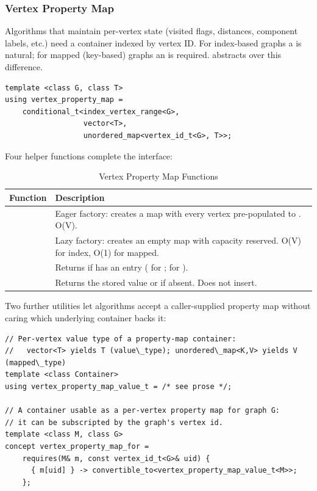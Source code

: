 \subsubsection{Vertex Property Map}

Algorithms that maintain per-vertex state (visited flags, distances, component labels,
etc.) need a container indexed by vertex ID. For index-based graphs a  is
natural; for mapped (key-based) graphs an  is required.
 abstracts over this difference.

\begin{lstlisting}
template <class G, class T>
using vertex_property_map =
    conditional_t<index_vertex_range<G>,
                  vector<T>,
                  unordered_map<vertex_id_t<G>, T>>;
\end{lstlisting}

Four helper functions complete the interface:

\begin{table}[h!]
\begin{center}
\resizebox{\textwidth}{!}
{\begin{tabular}{l L{9cm}}
\hline
    \textbf{Function} & \textbf{Description} \\
\hline
     & Eager factory: creates a map with every vertex pre-populated to . O(V). \\
      & Lazy factory: creates an empty map with capacity reserved. O(V) for index, O(1) for mapped. \\
     & Returns  if  has an entry ( for ;  for ). \\
     & Returns the stored value or  if absent. Does not insert. \\
\hline
\hline
\end{tabular}}
\caption{Vertex Property Map Functions}
\label{tab:vpm_func}
\end{center}
\end{table}

Two further utilities let algorithms accept a caller-supplied property map without
caring which underlying container backs it:

\begin{lstlisting}
// Per-vertex value type of a property-map container:
//   vector<T> yields T (value\_type); unordered\_map<K,V> yields V (mapped\_type)
template <class Container>
using vertex_property_map_value_t = /* see prose */;

// A container usable as a per-vertex property map for graph G:
// it can be subscripted by the graph's vertex id.
template <class M, class G>
concept vertex_property_map_for =
    requires(M& m, const vertex_id_t<G>& uid) {
      { m[uid] } -> convertible_to<vertex_property_map_value_t<M>>;
    };
\end{lstlisting}

